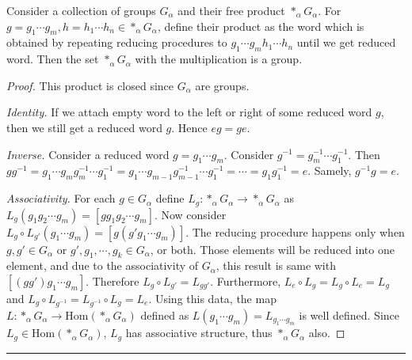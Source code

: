 \begin{prop} Consider a collection of groups $G_{\alpha}$ and their free product $*_\alpha G_\alpha$. For $g=g_1\cdots g_m,h=h_1\cdots h_n\in *_\alpha G_\alpha$, define their product as the word which is obtained by repeating reducing procedures to $g_1\cdots g_mh_1\cdots h_n$ until we get reduced word. Then the set $*_\alpha G_\alpha$ with the multiplication is a group.
\end{prop}
\begin{proof} This product is closed since $G_{\alpha}$ are groups.

\textit{Identity.} If we attach empty word to the left or right of some reduced word $g$, then we still get a reduced word $g$. Hence $eg=ge$.

\textit{Inverse.} Consider a reduced word $g=g_1\cdots g_m$. Consider $g^{-1}=g_m^{-1}\cdots g_1^{-1}$. Then $gg^{-1}=g_1\cdots g_mg_m^{-1}\cdots g_1^{-1}=g_1\cdots g_{m-1}g_{m-1}^{-1}\cdots g_1^{-1}=\cdots=g_1g_1^{-1}=e$. Samely, $g^{-1}g=e$.

\textit{Associativity.} For each $g\in G_{\alpha}$ define $L_g:*_\alpha G_\alpha\rightarrow *_\alpha G_\alpha$ as $L_g(g_1g_2\cdots g_m)=[gg_1g_2\cdots g_m]$. Now consider $L_g\circ L_{g'}(g_1\cdots g_m)=[g(g'g_1\cdots g_m)]$. The reducing procedure happens only when $g,g'\in G_{\alpha}$ or $g',g_1,\cdots,g_k\in G_{\alpha}$, or both. Those elements will be reduced into one element, and due to the associativity of $G_\alpha$, this result is same with $[(gg')g_1\cdots g_m]$. Therefore $L_g\circ L_{g'}=L_{gg'}$. Furthermore, $L_e\circ L_g=L_g\circ L_e=L_g$ and $L_g\circ L_{g^{-1}}=L_{g^{-1}}\circ L_g=L_e$. Using this data, the map $L:*_\alpha G_\alpha \rightarrow \textrm{Hom}(*_\alpha G_\alpha)$ defined as $L(g_1\cdots g_m)=L_{g_1\cdots g_m}$ is well defined. Since $L_g\in \textrm{Hom}(*_\alpha G_\alpha)$, $L_g$ has associative structure, thus $*_\alpha G_\alpha$ also.
\end{proof}
\noindent\rule{\textwidth}{1pt}
\newline